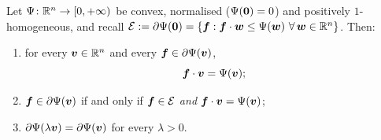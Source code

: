 \begin{lemma}\label{lem:saturation}
Let $\Psi\colon\mathbb{R}^n\to[0,+\infty)$ be convex, normalised
($\Psi(\bm{0})=0$) and positively $1$-homogeneous, and recall
$\mathcal{E}:=\partial\Psi(\bm{0})=\{\bm{f}:\bm{f}\cdot\bm{w}\le\Psi(\bm{w})\ \forall\,\bm{w}\in\mathbb{R}^n\}$.
Then:
\begin{enumerate}[label=\textnormal{(\roman*)},leftmargin=2.4em,itemsep=2pt]
  \item\label{sat:i} for every $\bm{v}\in\mathbb{R}^n$ and every
  $\bm{f}\in\partial\Psi(\bm{v})$,
  \begin{equation}\label{eq:saturation}
    \bm{f}\cdot\bm{v}=\Psi(\bm{v});
  \end{equation}
  \item\label{sat:ii} $\bm{f}\in\partial\Psi(\bm{v})$ if and only if
  $\bm{f}\in\mathcal{E}$ \emph{and} $\bm{f}\cdot\bm{v}=\Psi(\bm{v})$;
  \item\label{sat:iii} $\partial\Psi(\lambda\bm{v})=\partial\Psi(\bm{v})$
  for every $\lambda>0$.
\end{enumerate}
\end{lemma}

